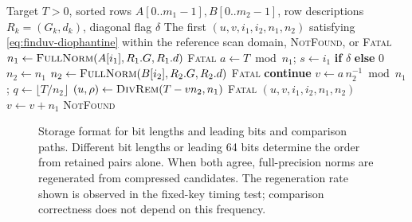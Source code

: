 \documentclass[a4paper,10pt]{article}
\theoremstyle{definition}
\theoremstyle{remark}
\begin{document}
\begin{algorithm}[H]
  \caption{Candidate-pair search over two sorted rows preserving reference scan order}
  \label{alg:pair-search}
  \small
  \begin{algorithmic}[1]
    \Require Target $T>0$, sorted rows $A[0..m_1-1],B[0..m_2-1]$,
      row descriptions $R_k=(G_k,d_k)$, diagonal flag $\delta$
    \Ensure The first $(u,v,i_1,i_2,n_1,n_2)$ satisfying \cref{eq:finduv-diophantine}
      within the reference scan domain, \textsc{NotFound}, or \textsc{Fatal}
        \State $n_1\gets\Call{FullNorm}{A[i_1],R_1.G,R_1.d}$
         \State \Return \textsc{Fatal} \EndIf
        \State $a\gets T\bmod n_1$; $s\gets i_1$ \textbf{if} $\delta$ \textbf{else} $0$
            \State $n_2\gets n_1$
          \Else
            \State $n_2\gets\Call{FullNorm}{B[i_2],R_2.G,R_2.d}$
             \State \Return \textsc{Fatal} \EndIf
          \EndIf
           \State \textbf{continue} \EndIf
          \State $v\gets a\,n_2^{-1}\bmod n_1$; $q\gets\lfloor T/n_2\rfloor$
            \State $(u,\rho)\gets\Call{DivRem}{T-vn_2,n_1}$
             \State \Return \textsc{Fatal} \EndIf
             \State \Return $(u,v,i_1,i_2,n_1,n_2)$ \EndIf
            \State $v\gets v+n_1$
          \EndWhile
        \EndFor
      \EndFor
      \State \Return \textsc{NotFound}
    \EndFunction
  \end{algorithmic}
\end{algorithm}

\begin{figure}[H]
  \centering
  
  \caption{Storage format for bit lengths and leading bits and comparison paths. Different bit lengths or leading 64 bits determine the order from retained pairs alone. When both agree, full-precision norms are regenerated from compressed candidates. The regeneration rate shown is observed in the fixed-key timing test; comparison correctness does not depend on this frequency.}
  \label{fig:sketch-flow}
\end{figure}
\end{document}
